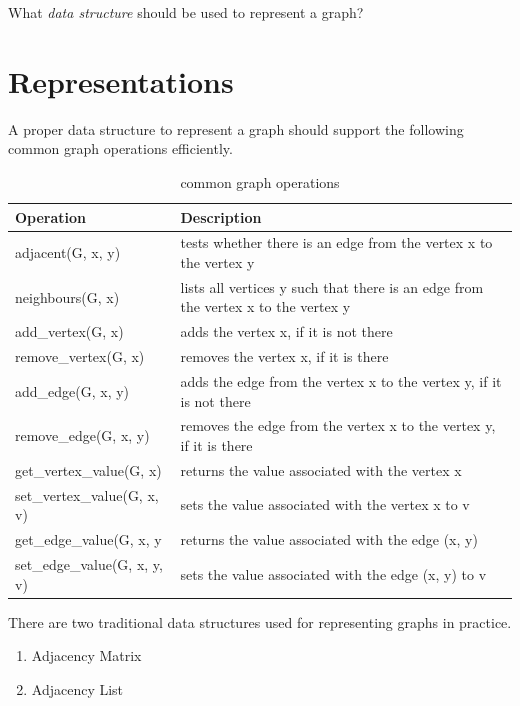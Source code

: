 \documentclass[
]{book}
\providecommand{\tightlist}{%
  \setlength{\itemsep}{0pt}\setlength{\parskip}{0pt}}
\begin{document}
What \emph{data structure} should be used to represent a graph?

\hypertarget{repr}{%
\section{Representations}\label{repr}}

A proper data structure to represent a graph should support the following common graph operations efficiently.

\begin{table}

\caption{\label{tab:grap-ops}common graph operations}
\centering
\begin{tabular}[t]{ll}
\toprule
Operation & Description\\
\midrule
adjacent(G, x, y) & tests whether there is an edge from the vertex x to the vertex y\\
neighbours(G, x) & lists all vertices y such that there is an edge from the vertex x to the vertex y\\
add\_vertex(G, x) & adds the vertex x, if it is not there\\
remove\_vertex(G, x) & removes the vertex x, if it is there\\
add\_edge(G, x, y) & adds the edge from the vertex x to the vertex y, if it is not there\\
\addlinespace
remove\_edge(G, x, y) & removes the edge from the vertex x to the vertex y, if it is there\\
get\_vertex\_value(G, x) & returns the value associated with the vertex x\\
set\_vertex\_value(G, x, v) & sets the value associated with the vertex x to v\\
get\_edge\_value(G, x, y & returns the value associated with the edge (x, y)\\
set\_edge\_value(G, x, y, v) & sets the value associated with the edge (x, y) to v\\
\bottomrule
\end{tabular}
\end{table}

There are two traditional data structures used for representing graphs in practice.

\begin{enumerate}
\def\labelenumi{\arabic{enumi}.}
\tightlist
\item
  {Adjacency Matrix}
\item
  {Adjacency List}
\end{enumerate}
\end{document}
